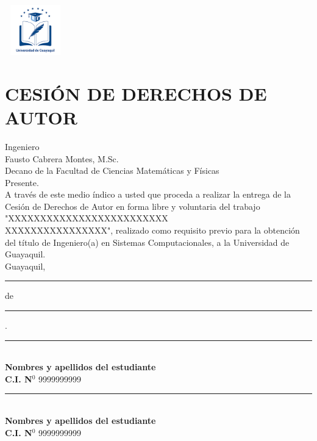 \documentclass[12pt, a4paper, nofontenc, numbers=endperiod]{apa7}
\begin{document}
	{ %
		\begin{center}	
			\includegraphics[width=2.65cm,height=2.17cm]{Imagenes/Figura1}
		\end{center}
		\vspace*{-1cm}
		\section*{\large \centering CESIÓN DE DERECHOS DE AUTOR}
		\justify
		Ingeniero\\
		Fausto Cabrera Montes, M.Sc.\\
		Decano de la Facultad de Ciencias Matemáticas y Físicas\\
		Presente. \\[-0.5cm]
		\justify	
		A través de este medio índico a usted que proceda a realizar la entrega de la Cesión de Derechos de Autor en forma libre y voluntaria del trabajo "XXXXXXXXXXXXXXXXXXXXXXXXX\\XXXXXXXXXXXXXXXX", realizado como requisito previo para la obtención del título de Ingeniero(a) en Sistemas Computacionales, a la Universidad de Guayaquil.\\[-0.5cm]
		\justify	
		Guayaquil, \rule[0mm]{10mm}{0.1mm}	de \rule[0mm]{10mm}{0.1mm}.\\
		\begin{center}
			\singlespacing	
			\rule[1mm]{70mm}{0.1mm}	\\
			\textbf{Nombres y apellidos del estudiante} \\
			\textbf{C.I. N$^{0}$} 9999999999 \\[1cm]
		\end{center}
		
		\begin{center}	
			\singlespacing
			{\color{red}\rule[1mm]{70mm}{0.1mm}	}	\\
			\textbf{{\color{red}Nombres y apellidos del estudiante}} \\
			\textbf{{\color{red}C.I. N$^{0}$}} {\color{red}9999999999} 
		\end{center}
	}
	\newpage
\end{document}
